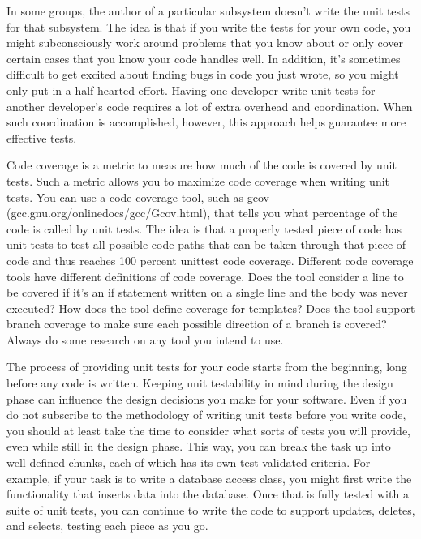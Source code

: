 In some groups, the author of a particular subsystem doesn’t write the unit tests for that subsystem. The idea is that if you write the tests for your own code, you might subconsciously work around problems that you know about or only cover certain cases that you know your code handles well. In addition, it’s sometimes difficult to get excited about finding bugs in code you just wrote, so you might only put in a half-hearted effort. Having one developer write unit tests for another developer’s code requires a lot of extra overhead and coordination. When such coordination is accomplished, however, this approach helps guarantee more effective tests.

Code coverage is a metric to measure how much of the code is covered by unit tests. Such a metric allows you to maximize code coverage when writing unit tests. You can use a code coverage tool, such as gcov (gcc.gnu.org/onlinedocs/gcc/Gcov.html), that tells you what percentage of the code is called by unit tests. The idea is that a properly tested piece of code has unit tests to test all possible code paths that can be taken through that piece of code and thus reaches 100 percent unittest code coverage. Different code coverage tools have different definitions of code coverage. Does the tool consider a line to be covered if it’s an if statement written on a single line and the body was never executed? How does the tool define coverage for templates? Does the tool support branch coverage to make sure each possible direction of a branch is covered? Always do some research on any tool you intend to use.


The process of providing unit tests for your code starts from the beginning, long before any code is written. Keeping unit testability in mind during the design phase can influence the design decisions you make for your software. Even if you do not subscribe to the methodology of writing unit tests before you write code, you should at least take the time to consider what sorts of tests you will provide, even while still in the design phase. This way, you can break the task up into well-defined chunks, each of which has its own test-validated criteria. For example, if your task is to write a database access class, you might first write the functionality that inserts data into the database. Once that is fully tested with a suite of unit tests, you can continue to write the code to support updates, deletes, and selects, testing each piece as you go.

